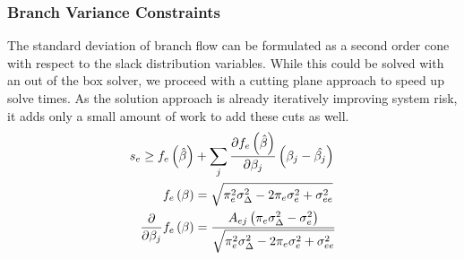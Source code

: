 \subsubsection*{Branch Variance Constraints}
The standard deviation of branch flow can be formulated as a second order cone with respect to the slack distribution variables.  While this could be solved with an out of the box solver, we proceed with a cutting plane approach to speed up solve times.  As the solution approach is already iteratively improving system risk, it adds only a small amount of work to add these cuts as well.
\begin{subequations}
\label{branch_var_cuts}
\begin{align}
s_e \geq f_e\left(\hat{\beta}\right) &+ \sum_j \frac{\partial f_e\left(\hat{\beta} \right)}{\partial \beta_j} \left( \beta_j - \hat{\beta_j} \right)\\
  f_e\left(\beta\right) &= \sqrt{\pi_e^2 \sigma_\Delta^2 - 2 \pi_e \sigma_e^2  + \sigma_{ee}^2 }\\
  \frac{\partial}{\partial \beta_j}f_e\left(\beta\right) &= \frac{A_{ej} \left( \pi_e \sigma_\Delta^2 - \sigma_e^2 \right)}{\sqrt{\pi_e^2 \sigma_\Delta^2 - 2 \pi_e \sigma_e^2  + \sigma_{ee}^2 }}
\end{align}
\end{subequations}


